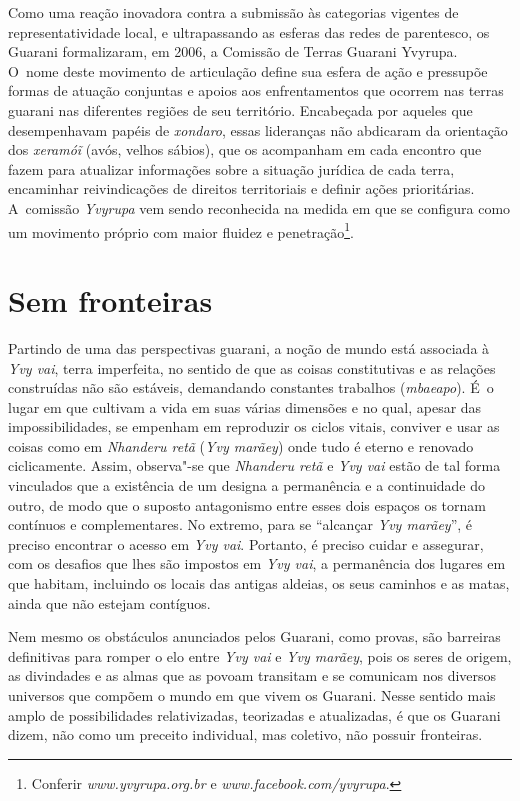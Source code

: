 Como uma reação inovadora contra a submissão às categorias vigentes de
representatividade local, e ultrapassando as esferas das redes de
parentesco, os Guarani formalizaram, em 2006, a Comissão de Terras
Guarani Yvyrupa. O~nome deste movimento de articulação define sua
esfera de ação e pressupõe formas de atuação conjuntas e apoios aos
enfrentamentos que ocorrem nas terras guarani nas diferentes regiões de
seu território. Encabeçada por aqueles que desempenhavam papéis de
\emph{xondaro}, essas lideranças não abdicaram da orientação dos
\emph{xeramóĩ} (avós, velhos sábios), que os acompanham
em cada encontro que fazem para atualizar informações sobre a situação
jurídica de cada terra, encaminhar reivindicações de direitos
territoriais e definir ações prioritárias. A~comissão \emph{Yvyrupa} vem sendo
reconhecida na medida em que se configura como um movimento próprio com
maior fluidez e penetração\footnote{Conferir \emph{www.yvyrupa.org.br} e
\emph{www.facebook.com/yvyrupa}.}. 

\section{Sem fronteiras}

Partindo de uma das perspectivas guarani, a noção de mundo está
associada à \emph{Yvy vai}, terra imperfeita, no sentido de que as coisas
constitutivas e as relações construídas não são estáveis, demandando
constantes trabalhos (\emph{mbaeapo}). É~o lugar em que cultivam a vida em
suas várias dimensões e no qual, apesar das impossibilidades, se
empenham em reproduzir os ciclos vitais, conviver e usar as coisas como
em \emph{Nhanderu retã} (\emph{Yvy marãey}) onde tudo é eterno e renovado
ciclicamente. Assim, observa"-se que \emph{Nhanderu retã} e \emph{Yvy vai} estão de
tal forma vinculados que a existência de um designa a permanência e a
continuidade do outro, de modo que o suposto antagonismo entre esses
dois espaços os tornam contínuos e complementares. No extremo, para se
``alcançar \emph{Yvy marãey}'', é preciso encontrar o acesso em \emph{Yvy vai}.
Portanto, é preciso cuidar e assegurar, com os desafios que lhes são
impostos em \emph{Yvy vai}, a permanência dos lugares em que habitam,
incluindo os locais das antigas aldeias, os seus caminhos e as matas,
ainda que não estejam contíguos. 

Nem mesmo os obstáculos anunciados pelos Guarani, como provas, são
barreiras definitivas para romper o elo entre \emph{Yvy vai} e \emph{Yvy marãey},
pois os seres de origem, as divindades e as almas que as povoam
transitam e se comunicam nos diversos universos que compõem o mundo em
que vivem os Guarani. Nesse sentido mais amplo de possibilidades
relativizadas, teorizadas e atualizadas, é que os Guarani dizem, não
como um preceito individual, mas coletivo, não possuir fronteiras.

